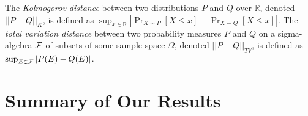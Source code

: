 \begin{definition} \label{def:Kolm and TV}
The {\em Kolmogorov distance} between two distributions $P$ and $Q$ over $\mathbb{R}$, denoted $|| P-Q||_K$, is defined as $\sup_{x \in \mathbb{R}}|\Pr_{X \sim P}[X \le x]-\Pr_{X \sim Q}[X \le x]|$. The {\em total variation distance} between two probability measures $P$ and $Q$ on a sigma-algebra $\cal F$ of subsets of some sample space $\Omega$, denoted $|| P-Q||_{TV}$, is defined as $\sup_{E \in {\cal F}}|P({E})-Q({E})|$.
\end{definition}

\section{Summary of Our Results}

